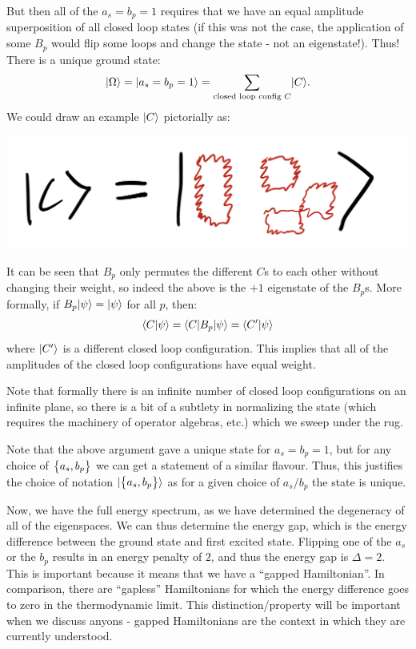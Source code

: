 But then all of the $a_s = b_p = 1$ requires that we have an equal amplitude superposition of all closed loop states (if this was not the case, the application of some $B_p$ would flip some loops and change the state - not an eigenstate!). Thus! There is a unique ground state:
\begin{equation}
    \lvert \Omega \rangle = \lvert a_s = b_p = 1 \rangle = \sum_{\text{closed loop config $C$}}\lvert C \rangle.
\end{equation}
We could draw an example $\lvert C \rangle$ pictorially as:
\begin{center}
    \includegraphics[scale=0.3]{Lectures/Images/lec1-closedloop.png}
\end{center}
It can be seen that $B_p$ only permutes the different $C$s to each other without changing their weight, so indeed the above is the $+1$ eigenstate of the $B_p$s. More formally, if $B_p\lvert \psi \rangle = \lvert \psi \rangle$ for all $p$, then:
\begin{equation}
    \langle C \lvert \psi \rangle = \langle C \rvert B_p\lvert \psi \rangle = \langle C' \lvert \psi \rangle
\end{equation}
where $\lvert C' \rangle$ is a different closed loop configuration. This implies that all of the amplitudes of the closed loop configurations have equal weight.

Note that formally there is an infinite number of closed loop configurations on an infinite plane, so there is a bit of a subtlety in normalizing the state (which requires the machinery of operator algebras, etc.) which we sweep under the rug.

Note that the above argument gave a unique state for $a_s = b_p = 1$, but for any choice of $\set{a_s, b_p}$ we can get a statement of a similar flavour. Thus, this justifies the choice of notation $\lvert \set{a_s, b_p} \rangle$ as for a given choice of $a_s/b_p$ the state is unique.

Now, we have the full energy spectrum, as we have determined the degeneracy of all of the eigenspaces. We can thus determine the energy gap, which is the energy difference between the ground state and first excited state. Flipping one of the $a_s$ or the $b_p$ results in an energy penalty of $2$, and thus the energy gap is $\Delta = 2$. This is important because it means that we have a ``gapped Hamiltonian''. In comparison, there are ``gapless'' Hamiltonians for which the energy difference goes to zero in the thermodynamic limit. This distinction/property will be important when we discuss anyons - gapped Hamiltonians are the context in which they are currently understood.

